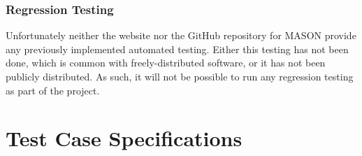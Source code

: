 \documentclass[11pt]{article}
\begin{document}

\subsubsection{Regression Testing}
Unfortunately neither the website nor the GitHub repository for MASON provide any previously implemented automated testing.
Either this testing has not been done, which is common with freely-distributed software, or it has not been publicly distributed.
As such, it will not be possible to run any regression testing as part of the project.

\newpage
\section{Test Case Specifications}%
\end{document}
